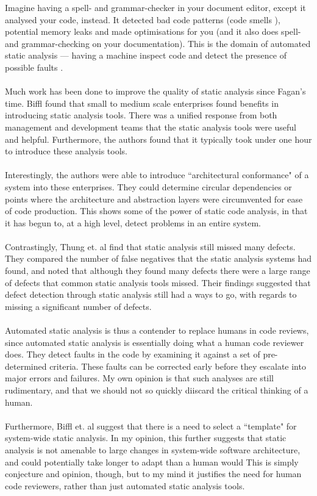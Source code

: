 Imagine having a spell- and grammar-checker in your document editor, except it analysed your code,
instead.
It detected bad code patterns (code smells \FIXME), potential memory leaks and made optimisations
for you (and it also does spell- and grammar-checking on your documentation).
This is the domain of automated static analysis --- having a machine inspect code and detect the
presence of possible faults \FIXME.\\
\\
Much work has been done to improve the quality of static analysis since Fagan's time.
Biffl \cite{Biffl2012BenefitAutomatedStaticAnalysis} found that small to medium scale enterprises
found benefits in introducing static analysis tools.
There was a unified response from both management and development teams that the static analysis
tools were useful and helpful.
Furthermore, the authors found that it typically took under one hour to
introduce these analysis tools.\\
\\
Interestingly, the authors were able to introduce ``architectural conformance" of a system into
these enterprises.
They could determine circular dependencies or points where the architecture and abstraction layers
were circumvented for ease of code production.
This shows some of the power of static code analysis, in that it has begun to, at a high level,
detect problems in an entire system.\\
\\
Contrastingly, Thung et. al \cite{Thung:2012:EWD:2351676.2351685} find that static analysis still
missed many defects.
They compared the number of false negatives that the static analysis systems had found,
and noted that although they found many defects there were a large range of defects that common
static analysis tools missed.
Their findings suggested that defect detection through static analysis still had a ways to go, with
regards to missing a significant number of defects.\\
\\
Automated static analysis is thus a contender to replace humans in code reviews, since automated
static analysis is essentially doing what a human code reviewer does.
They detect faults in the code by examining it against a set of pre-determined criteria.
These faults can be corrected early before they escalate into major errors and failures.
My own opinion is that such analyses are still rudimentary, and that we should not so quickly
diiscard the critical thinking of a human.\\
\\
Furthermore, Biffl et. al \cite{Biffl2012BenefitAutomatedStaticAnalysis} suggest that there is a need to
select a ``template" for system-wide static analysis.
In my opinion, this further suggests that static analysis is not amenable to large changes in
system-wide software architecture, and could potentially take longer to adapt than a human would
This is simply conjecture and opinion, though, but to my mind it justifies the need for human code
reviewers, rather than just automated static analysis tools.

